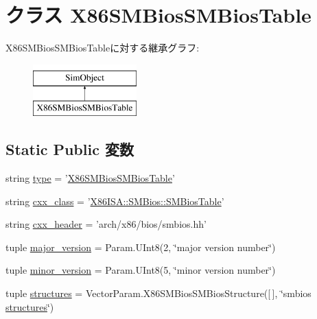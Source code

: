 \hypertarget{classSMBios_1_1X86SMBiosSMBiosTable}{
\section{クラス X86SMBiosSMBiosTable}
\label{classSMBios_1_1X86SMBiosSMBiosTable}
}
X86SMBiosSMBiosTableに対する継承グラフ:\begin{figure}[H]
\begin{center}
\leavevmode
\includegraphics[height=2cm]{classSMBios_1_1X86SMBiosSMBiosTable}
\end{center}
\end{figure}
\subsection*{Static Public 変数}
\begin{DoxyCompactItemize}
\item 
string \hyperlink{classSMBios_1_1X86SMBiosSMBiosTable_acce15679d830831b0bbe8ebc2a60b2ca}{type} = '\hyperlink{classSMBios_1_1X86SMBiosSMBiosTable}{X86SMBiosSMBiosTable}'
\item 
string \hyperlink{classSMBios_1_1X86SMBiosSMBiosTable_a58cd55cd4023648e138237cfc0822ae3}{cxx\_\-class} = '\hyperlink{classX86ISA_1_1SMBios_1_1SMBiosTable}{X86ISA::SMBios::SMBiosTable}'
\item 
string \hyperlink{classSMBios_1_1X86SMBiosSMBiosTable_a17da7064bc5c518791f0c891eff05fda}{cxx\_\-header} = 'arch/x86/bios/smbios.hh'
\item 
tuple \hyperlink{classSMBios_1_1X86SMBiosSMBiosTable_ac557741270717fefb4c17ddc82079890}{major\_\-version} = Param.UInt8(2, \char`\"{}major version number\char`\"{})
\item 
tuple \hyperlink{classSMBios_1_1X86SMBiosSMBiosTable_a0c85aae24f1a132c061845c52511f5a5}{minor\_\-version} = Param.UInt8(5, \char`\"{}minor version number\char`\"{})
\item 
tuple \hyperlink{classSMBios_1_1X86SMBiosSMBiosTable_a4912bbdac7af98091fd2e9c683e0f7d3}{structures} = VectorParam.X86SMBiosSMBiosStructure(\mbox{[}$\,$\mbox{]}, \char`\"{}smbios \hyperlink{classSMBios_1_1X86SMBiosSMBiosTable_a4912bbdac7af98091fd2e9c683e0f7d3}{structures}\char`\"{})
\end{DoxyCompactItemize}


